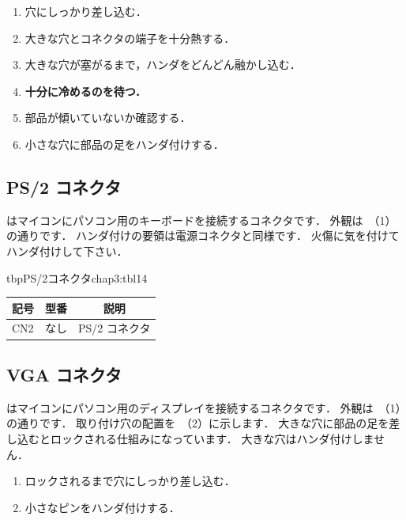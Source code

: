 
\begin{enumerate}
\item 穴にしっかり差し込む．
\item 大きな穴とコネクタの端子を十分熱する．
\item 大きな穴が塞がるまで，ハンダをどんどん融かし込む．
\item {\bf 十分に冷めるのを待つ．}
\item 部品が傾いていないか確認する．
\item 小さな穴に部品の足をハンダ付けする．
\end{enumerate}

\subsection{PS/2 コネクタ}
はマイコンにパソコン用のキーボードを接続するコネクタです．
外観は~（1）の通りです．
ハンダ付けの要領は電源コネクタと同様です．
火傷に気を付けてハンダ付けして下さい．

\begin{mytable}{tbp}{PS/2コネクタ}{chap3:tbl14}
{\small\begin{tabular}{l|l|l}
\hline
\hline
\multicolumn{1}{c|}{記号} &
\multicolumn{1}{c|}{型番} &
\multicolumn{1}{c}{説明} \\
\hline
CN2 & なし & PS/2 コネクタ \\
\end{tabular}}
\end{mytable}


\subsection{VGA コネクタ}
はマイコンにパソコン用のディスプレイを接続するコネクタです．
外観は~（1）の通りです．
取り付け穴の配置を~（2）に示します．
大きな穴に部品の足を差し込むとロックされる仕組みになっています．
大きな穴はハンダ付けしません．

\begin{enumerate}
\item ロックされるまで穴にしっかり差し込む．
\item 小さなピンをハンダ付けする．
\end{enumerate}

